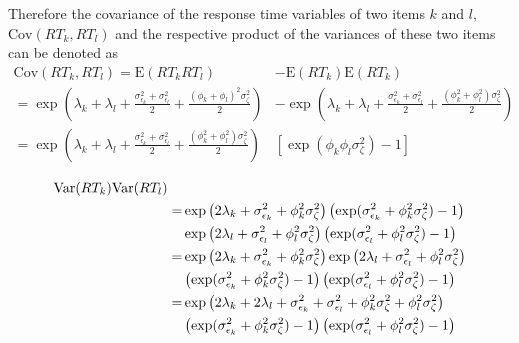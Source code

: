 \documentclass[a4paper,man,apacite,donotrepeattitle]{apa6}
\newcommand{\E}{\mathrm{E}}
\newcommand{\Var}{\mathrm{Var}}
\newcommand{\Cov}{\mathrm{Cov}}
\begin{document}
Therefore the covariance of the response time variables of two items $k$ and $l$, $\Cov(RT_k, RT_l)$ and the respective product of the variances of these two items can be denoted as
\begin{equation}
\begin{alignedat}{1}
\label{CovRT}
\Cov(RT_k, RT_l) = \E(RT_k RT_l) & - \E(RT_k) \E(RT_k) \\ 
                 = \exp \left( \lambda_{k} + \lambda_{l} + \frac{\sigma^2_{\epsilon_{k}} + \sigma^2_{\epsilon_{l}}}{2} + \frac{(\phi_{k} + \phi_{l})^2 \sigma^2_{\zeta}}{2} \right) & - \exp \left( \lambda_{k} + \lambda_{l} + \frac{\sigma^2_{\epsilon_{k}} + \sigma^2_{\epsilon_{l}}}{2}  + \frac{(\phi_{k}^2 + \phi_{l}^2) \sigma^2_{\zeta}}{2} \right) \\ 
                 =  \exp \left( \lambda_{k} + \lambda_{l} + \frac{\sigma^2_{\epsilon_{k}} + \sigma^2_{\epsilon_{l}}}{2}  + \frac{(\phi_{k}^2 + \phi_{l}^2) \sigma^2_{\zeta}}{2} \right) & \left[ \exp \left( \phi_{k}\phi_{l} \sigma^2_{\zeta} \right) -1 \right]
\end{alignedat}
\end{equation}

\begin{equation}
\begin{alignedat}{2}
\label{VarVar}
\Var(RT_k) \Var(RT_l) \\ & = &&\exp \left( 2 \lambda_{k} + \sigma^2_{\epsilon_{k}} + \phi^2_{k} \sigma^2_{\zeta} \right) \left( \exp(\sigma^2_{\epsilon_{k}} + \phi^2_{k} \sigma^2_{\zeta}) - 1 \right) \\ &\textcolor{white}{x} &&\exp \left( 2 \lambda_{l} + \sigma^2_{\epsilon_{l}} + \phi^2_{l} \sigma^2_{\zeta} \right) \left( \exp(\sigma^2_{\epsilon_{l}} + \phi^2_{l} \sigma^2_{\zeta}) - 1 \right) \\
& = &&\exp \left( 2 \lambda_{k} + \sigma^2_{\epsilon_{k}} + \phi^2_{k} \sigma^2_{\zeta} \right) \exp \left( 2 \lambda_{l} + \sigma^2_{\epsilon_{l}} + \phi^2_{l} \sigma^2_{\zeta} \right) \\ &\textcolor{white}{x} && \left( \exp(\sigma^2_{\epsilon_{k}} + \phi^2_{k} \sigma^2_{\zeta}) - 1 \right)  \left( \exp(\sigma^2_{\epsilon_{l}} + \phi^2_{l} \sigma^2_{\zeta}) - 1 \right) \\
 & = &&\exp \left( 2 \lambda_{k} + 2 \lambda_{l} + \sigma^2_{\epsilon_{k}} +  \sigma^2_{\epsilon_{l}} + \phi^2_{k} \sigma^2_{\zeta} + \phi^2_{l} \sigma^2_{\zeta} \right) \\ &\textcolor{white}{x} &&  \left( \exp(\sigma^2_{\epsilon_{k}} + \phi^2_{k} \sigma^2_{\zeta}) - 1 \right)  \left( \exp(\sigma^2_{\epsilon_{l}} + \phi^2_{l} \sigma^2_{\zeta}) - 1 \right) 
\end{alignedat}
\end{equation}
\end{document}
